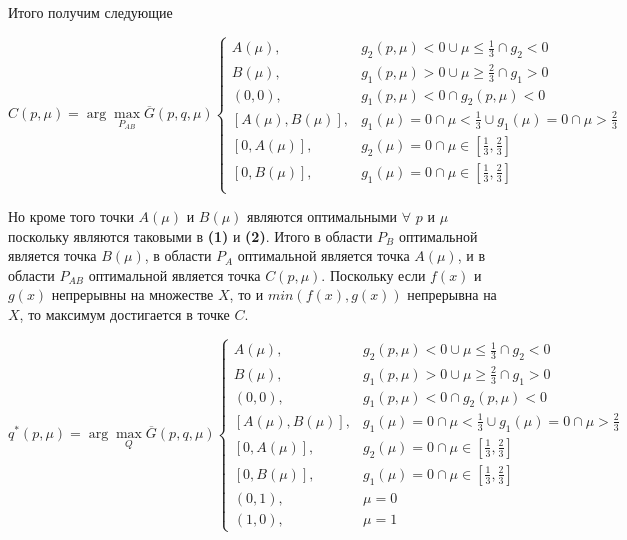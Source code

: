 	Итого получим следующие 

	$C(p,\mu) = \arg \max \limits_{P_{AB}} \overline{G}(p,q,\mu)
	\begin{cases}
	A(\mu), & g_2(p,\mu)<0 \cup \mu \leqslant \frac{1}{3} \cap g_2 < 0 \\
	B(\mu), & g_1(p,\mu)>0 \cup \mu \geqslant \frac{2}{3} \cap g_1 > 0 \\
	(0,0),  & g_1(p,\mu)<0 \cap g_2(p,\mu)<0 \\
	[A(\mu), B(\mu)], 
	& g_1(\mu)=0 \cap \mu < \frac{1}{3} \cup g_1(\mu)=0 \cap \mu > \frac{2}{3} \\
	[0, A(\mu)], & g_2(\mu)=0 \cap \mu \in [\frac{1}{3},\frac{2}{3}] \\
	[0, B(\mu)], & g_1(\mu)=0 \cap \mu \in [\frac{1}{3},\frac{2}{3}] \\
	\end{cases}	
	$	
	
	Но кроме того точки $A(\mu)$ и $B(\mu)$ являются оптимальными 
	$\forall$ $p$ и $\mu$ поскольку	являются таковыми в \textbf{(1)} и \textbf{(2)}.
	Итого в области $P_B$ оптимальной является точка $B(\mu)$,
	в области $P_A$ оптимальной является точка $A(\mu)$,
	и в области $P_{AB}$ оптимальной является точка $C(p, \mu)$.
	Поскольку если $f(x)$ и $g(x)$ непрерывны на множестве $X$, то и 
	$min(f(x), g(x))$ непрерывна на $X$, то максимум достигается в точке
	$C$.
	
	$q^*(p,\mu)= \arg \max \limits_Q \overline{G}(p,q,\mu)
	\begin{cases}
	A(\mu), & g_2(p,\mu)<0 \cup \mu \leqslant \frac{1}{3} \cap g_2 < 0 \\
	B(\mu), & g_1(p,\mu)>0 \cup \mu \geqslant \frac{2}{3} \cap g_1 > 0 \\
	(0,0),  & g_1(p,\mu)<0 \cap g_2(p,\mu)<0 \\
	[A(\mu), B(\mu)], 
	& g_1(\mu)=0 \cap \mu < \frac{1}{3} \cup g_1(\mu)=0 \cap \mu > \frac{2}{3} \\
	[0, A(\mu)], & g_2(\mu)=0 \cap \mu \in [\frac{1}{3},\frac{2}{3}] \\
	[0, B(\mu)], & g_1(\mu)=0 \cap \mu \in [\frac{1}{3},\frac{2}{3}] \\
	(0,1), & \mu = 0 \\
	(1,0), & \mu = 1
	\end{cases}	
	$		
	
	

	

